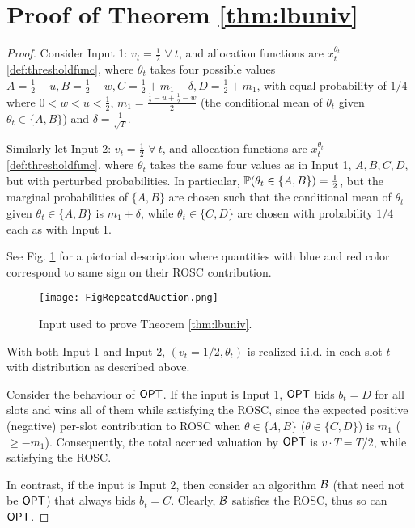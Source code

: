 \section{Proof of Theorem \ref{thm:lbuniv}}\label{app:lbequal}
\begin{proof}
Consider Input 1: $v_t=\frac{1}{2}$ $\forall \ t$, and allocation functions are $x_t^{\theta_t}$  \eqref{def:thresholdfunc}, where $\theta_t$ takes four possible values $A=\frac{1}{2}-u, B=\frac{1}{2}-w, C=\frac{1}{2} + m_1 - \delta, D=\frac{1}{2} + m_1$, with equal probability of $1/4$ where $0< w< u < \frac{1}{2}$, $m_1 = \frac{\frac{1}{2}-u + \frac{1}{2}-w}{2}$ (the conditional mean of $\theta_t$ given $\theta_t \in \{A,B\}$) and $\delta=\frac{1}{\sqrt{T}}$.

Similarly let Input 2: $v_t=\frac{1}{2}$ $\forall \ t$, and allocation functions are $x_t^{\theta_t}$ \eqref{def:thresholdfunc}, where $\theta_t$ takes the same four values as in Input 1, $A,B,C,D$, but with perturbed probabilities. 
In particular, ${\mathbb{P}}(\theta_t\in \{A, B\}) =\frac{1}{2}$, but the marginal probabilities of $\{A, B\}$ are chosen such that the conditional mean of $\theta_t$ given $\theta_t \in \{A,B\}$ is $m_1+\delta$, while 
$\theta_t\in\{C, D\}$ are chosen with probability $1/4$ each as with Input 1. 

See Fig. \ref{fig:inputrepauction} for a pictorial description where quantities with blue and red color correspond to same sign on their ROSC contribution.
\begin{figure}
\texttt{[image: FigRepeatedAuction.png]}
\caption{Input used to prove Theorem \ref{thm:lbuniv}.}
\label{fig:inputrepauction}
\end{figure}

With both Input 1 and Input 2, $(v_t=1/2, \theta_t)$ is realized i.i.d. in each slot $t$ with distribution as described above. 

Consider the behaviour of $\mathsf{OPT}$. If the input is Input 1, $\mathsf{OPT}$ bids $b_t = D$ for all slots and wins all of them while satisfying the ROSC, since the expected positive (negative) per-slot contribution to ROSC when $\theta \in \{A,B\}$ ($\theta \in \{C,D\}$) is $m_1$ ($\ge -m_1$). 
Consequently, the total  accrued valuation by $\mathsf{OPT}$ is $v\cdot T = T/2$, while satisfying the ROSC.

 In contrast, if the input is Input 2, then consider an algorithm $\mathcal{B}$ (that need not be $\mathsf{OPT}$) that always bids $b_t = C$. Clearly, $\mathcal{B}$ satisfies the ROSC, thus so can $\mathsf{OPT}$.


\end{proof}
